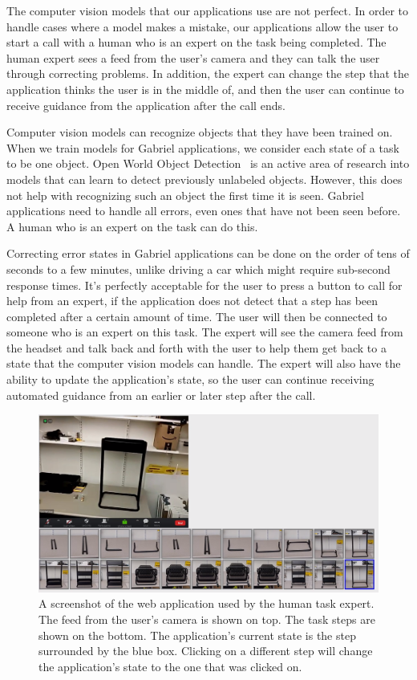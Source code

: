 The computer vision models that our applications use are not perfect. In order
to handle cases where a model makes a mistake, our applications allow the user
to start a call with a human who is an expert on the task being completed. The
human expert sees a feed from the user's camera and they can talk the user
through correcting problems. In addition, the expert can change the step that
the application thinks the user is in the middle of, and then the user can
continue to receive guidance from the application after the call ends.

Computer vision models can recognize objects that they have been trained on.
When we train models for Gabriel applications, we consider each state of a task
to be one object. Open World Object Detection~\cite{joseph2021open} is an active
area of research into models that can learn to detect previously unlabeled
objects. However, this does not help with recognizing such an object the first
time it is seen. Gabriel applications need to handle all errors, even ones that
have not been seen before. A human who is an expert on the task can do this.

Correcting error states in Gabriel applications can be done on the order of tens
of seconds to a few
minutes, unlike driving a car which might require sub-second response times.
It's perfectly acceptable for the user to press a button to call for help from
an expert, if the application does not detect that a step has been completed
after a certain amount of time. The user will then be connected to someone who
is an expert on this task. The expert will
see the camera feed from the headset and talk back and forth with the user to
help them get back to a state that the computer vision models can handle.
The expert will also have the ability to update the application's state, so the
user can continue receiving automated guidance from an earlier or later
step after the call.

\begin{figure}[h]
  \includegraphics[width=14cm]{figures/expert_ui.png}
  \caption{A screenshot of the web application used by the human task expert.
    The feed from the user's camera is shown on top. The task steps are shown on
    the bottom. The application's current state is the step surrounded by the
    blue box. Clicking on a different step will change the application's state
    to the one that was clicked on.
  }\label{fig:expertui}
\end{figure}

